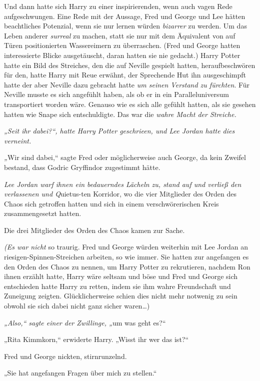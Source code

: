 {Und dann hatte sich Harry zu einer inspirierenden, wenn auch vagen Rede aufgeschwungen. Eine Rede mit der Aussage, Fred und George und Lee hätten beachtliches Potenzial, wenn sie nur lernen würden \emph{bizarrer} zu werden. Um das Leben anderer \emph{surreal} zu machen, statt sie nur mit dem Äquivalent von auf Türen positionierten Wassereimern zu überraschen. (Fred und George hatten interessierte Blicke ausgetäuscht, daran hatten sie nie gedacht.) Harry Potter hatte ein Bild des Streiches, den die auf Neville gespielt hatten, heraufbeschwören \later für den, hatte Harry mit Reue erwähnt, der Sprechende Hut ihn ausgeschimpft hatte \later der aber Neville dazu gebracht hatte \emph{um seinen Verstand zu fürchten}. Für Neville musste es sich angefühlt haben, als ob er in ein Paralleluniversum transportiert worden wäre. Genauso wie es sich alle gefühlt hatten, als sie gesehen hatten wie Snape sich entschuldigte. Das war die \emph{wahre Macht der Streiche.}

\emph{„Seit ihr dabei?“, hatte Harry Potter geschrieen, und Lee Jordan hatte dies verneint.}

\emph{„}Wir sind dabei,“ sagte Fred oder möglicherweise auch George, da kein Zweifel bestand, dass Godric Gryffindor zugestimmt hätte.

\emph{Lee Jordan warf ihnen ein bedauerndes Lächeln zu, stand auf und verließ den verlassenen und Q}uietus-ten Korridor, wo die vier Mitglieder des Orden des Chaos sich getroffen hatten und sich in einem verschwörerischen Kreis zusammengesetzt hatten.

Die drei Mitglieder des Orden des Chaos kamen zur Sache.

\emph{(Es war nicht} so traurig. Fred und George würden weiterhin mit Lee Jordan an riesigen-Spinnen-Streichen arbeiten, so wie immer. Sie hatten zur angefangen es den Orden des Chaos zu nennen, um Harry Potter zu rekrutieren, nachdem Ron ihnen erzählt hatte, Harry wäre seltsam und böse und Fred und George sich entschieden hatte Harry zu retten, indem sie ihm wahre Freundschaft und Zuneigung zeigten. Glücklicherweise schien dies nicht mehr notwenig zu sein \later obwohl sie sich dabei nicht ganz sicher waren…)

\emph{„Also,“ sagte einer der Zwillinge, „}um was geht es?“

„Rita Kimmkorn,“ erwiderte Harry. „Wisst ihr wer das ist?“

Fred und George nickten, stirnrunzelnd.

„Sie hat angefangen Fragen über mich zu stellen.“

}
